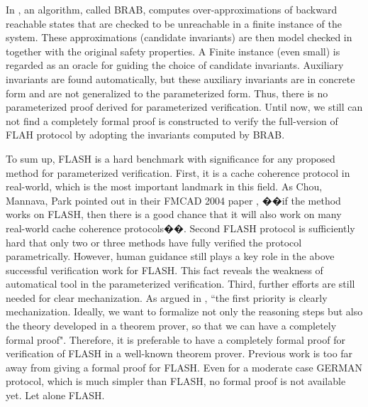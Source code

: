 \documentclass{llncs}
\begin{document}
In \cite{cubeicBeyond}, an algorithm, called BRAB,    computes over-approximations of
backward reachable states that are checked to be unreachable in
a finite instance of the system. These approximations (candidate
invariants) are then model checked in together with the original
safety properties. A Finite instance (even small) is regarded as
an oracle for guiding the choice of candidate
invariants. Auxiliary invariants are found automatically, but these auxiliary invariants are in concrete form and are not generalized to the parameterized form. Thus, there is no  parameterized proof derived for parameterized verification. Until now, we still can not find a completely formal proof is constructed to verify the full-version of FLAH protocol by adopting the invariants computed by BRAB. %

To sum up,  FLASH is a hard  benchmark with significance for any proposed method for parameterized verification. First, it is a cache coherence protocol in real-world, which is  the most important landmark in this field.  As Chou, Mannava, Park pointed out in their FMCAD 2004 paper \cite{Chou2004}, ��if the method works on FLASH, then there is a good chance that it will also work on many real-world cache coherence protocols��. Second
FLASH protocol is  sufficiently hard that only two or three methods have  fully verified
the protocol parametrically. However, human guidance still plays a key role in the above successful verification work for FLASH. This fact reveals  the weakness of automatical tool in the parameterized verification.  Third, further  efforts are still needed for clear mechanization. As argued in \cite{Chou2004}, ``the first priority is clearly mechanization. Ideally, we want to formalize not only the reasoning
steps  but also the theory developed in a theorem
prover, so that we can have a completely formal proof". Therefore, it is preferable to  have a completely formal proof for verification of FLASH in a well-known theorem prover. Previous work is too far away from giving a formal proof for FLASH. Even for a moderate case GERMAN protocol, which is much simpler than FLASH, no formal proof is not available yet. Let alone FLASH.
\end{document}
